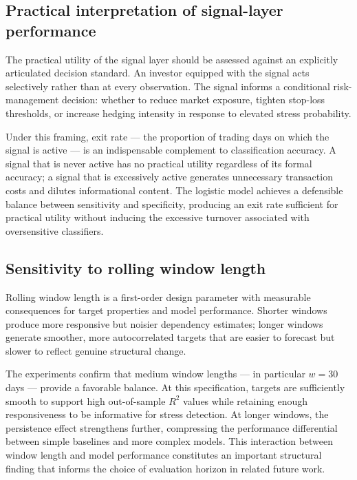 \subsection{Practical interpretation of signal-layer performance}

The practical utility of the signal layer should be assessed against an explicitly articulated decision standard. An investor equipped with the signal acts selectively rather than at every observation. The signal informs a conditional risk-management decision: whether to reduce market exposure, tighten stop-loss thresholds, or increase hedging intensity in response to elevated stress probability.

Under this framing, exit rate --- the proportion of trading days on which the signal is active --- is an indispensable complement to classification accuracy. A signal that is never active has no practical utility regardless of its formal accuracy; a signal that is excessively active generates unnecessary transaction costs and dilutes informational content. The logistic model achieves a defensible balance between sensitivity and specificity, producing an exit rate sufficient for practical utility without inducing the excessive turnover associated with oversensitive classifiers.

\subsection{Sensitivity to rolling window length}

Rolling window length is a first-order design parameter with measurable consequences for target properties and model performance. Shorter windows produce more responsive but noisier dependency estimates; longer windows generate smoother, more autocorrelated targets that are easier to forecast but slower to reflect genuine structural change.

The experiments confirm that medium window lengths --- in particular $w = 30$ days --- provide a favorable balance. At this specification, targets are sufficiently smooth to support high out-of-sample $R^2$ values while retaining enough responsiveness to be informative for stress detection. At longer windows, the persistence effect strengthens further, compressing the performance differential between simple baselines and more complex models. This interaction between window length and model performance constitutes an important structural finding that informs the choice of evaluation horizon in related future work.

